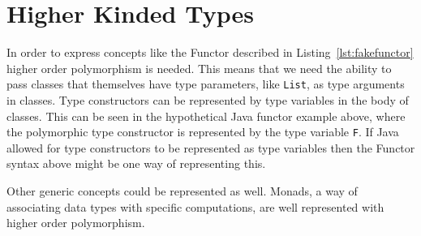 \section{Higher Kinded Types}

In order to express concepts like the Functor described in Listing~\ref{lst:fakefunctor}
higher order polymorphism is needed. This means that we need the ability to pass
classes that themselves have type parameters, like \lstinline{List}, as type
arguments in classes. Type constructors can be represented by type variables in
the body of classes. This can be seen in the hypothetical Java functor example
above, where the polymorphic type constructor is represented by the type variable
\lstinline{F}. If Java allowed for type constructors to be represented as type
variables then the Functor syntax above might be one way of representing this.

Other generic concepts could be represented as well. Monads, a way of associating
data types with specific computations, are well represented with higher order
polymorphism. 

